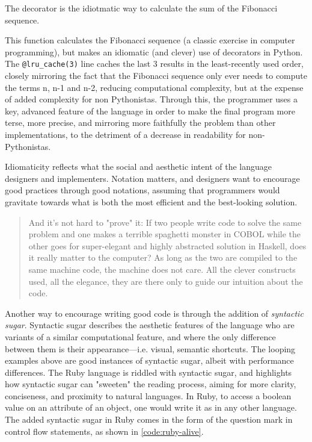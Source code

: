\begin{listing}
  \inputminted{python}{./corpus/fibonacci.py}
  \caption{The decorator is the idiotmatic way to calculate the sum of the Fibonacci sequence. \citep{schmitz_what_2015}}
  \label{code:fibonacci}
\end{listing}

This function calculates the Fibonacci sequence (a classic exercise in computer programming), but makes an idiomatic (and clever) use of decorators in Python. The \lstinline{@lru_cache(3)} line caches the last 3 results in the least-recently used order, closely mirroring the fact that the Fibonacci sequence only ever needs to compute the terms n, n-1 and n-2, reducing computational complexity, but at the expense of added complexity for non Pythonistas. Through this, the programmer uses a key, advanced feature of the language in order to make the final program more terse, more precise, and mirroring more faithfully the problem than other implementations, to the detriment of a decrease in readability for non-Pythonistas.

Idiomaticity reflects what the social and aesthetic intent of the language designers and implementers. Notation matters, and designers want to encourage good practices through good notations, assuming that programmers would gravitate towards what is both the most efficient and the best-looking solution.

\begin{quote}
  And it's not hard to "prove" it: If two people write code to solve the same problem and one makes a terrible spaghetti monster in COBOL while the other goes for super-elegant and highly abstracted solution in Haskell, does it really matter to the computer? As long as the two are compiled to the same machine code, the machine does not care. All the clever constructs used, all the elegance, they are there only to guide our intuition about the code. \citep{sustrik_nature_2021}
\end{quote}

Another way to encourage writing good code is through the addition of \emph{syntactic sugar}. Syntactic sugar describes the aesthetic features of the language who are variants of a similar computational feature, and where the only difference between them is their appearance—i.e. visual, semantic shortcuts. The looping examples above are good instances of syntactic sugar, albeit with performance differences. The Ruby language is riddled with syntactic sugar, and highlights how syntactic sugar can "sweeten" the reading process, aiming for more clarity, conciseness, and proximity to natural languages. In Ruby, to access a boolean value on an attribute of an object, one would write it as in any other language. The added syntactic sugar in Ruby comes in the form of the question mark in control flow statements, as shown in \ref{code:ruby-alive}.

